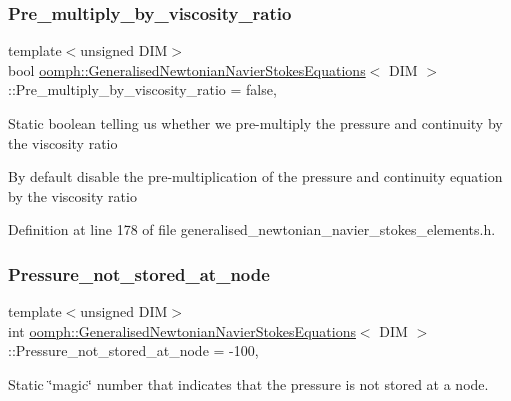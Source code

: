 \subsubsection{\texorpdfstring{Pre\+\_\+multiply\+\_\+by\+\_\+viscosity\+\_\+ratio}{Pre\_multiply\_by\_viscosity\_ratio}}
{\footnotesize\ttfamily template$<$unsigned D\+IM$>$ \\
bool \hyperlink{classoomph_1_1GeneralisedNewtonianNavierStokesEquations}{oomph\+::\+Generalised\+Newtonian\+Navier\+Stokes\+Equations}$<$ D\+IM $>$\+::Pre\+\_\+multiply\+\_\+by\+\_\+viscosity\+\_\+ratio = false\hspace{0.3cm}{\ttfamily [static]}, {\ttfamily [protected]}}

Static boolean telling us whether we pre-\/multiply the pressure and continuity by the viscosity ratio

By default disable the pre-\/multiplication of the pressure and continuity equation by the viscosity ratio 

Definition at line 178 of file generalised\+\_\+newtonian\+\_\+navier\+\_\+stokes\+\_\+elements.\+h.

\mbox{\label{classoomph_1_1GeneralisedNewtonianNavierStokesEquations_aa00dd91ac0f799d0f2798248db7e55d8}} 
\subsubsection{\texorpdfstring{Pressure\+\_\+not\+\_\+stored\+\_\+at\+\_\+node}{Pressure\_not\_stored\_at\_node}}
{\footnotesize\ttfamily template$<$unsigned D\+IM$>$ \\
int \hyperlink{classoomph_1_1GeneralisedNewtonianNavierStokesEquations}{oomph\+::\+Generalised\+Newtonian\+Navier\+Stokes\+Equations}$<$ D\+IM $>$\+::Pressure\+\_\+not\+\_\+stored\+\_\+at\+\_\+node = -\/100\hspace{0.3cm}{\ttfamily [static]}, {\ttfamily [private]}}



Static \char`\"{}magic\char`\"{} number that indicates that the pressure is not stored at a node. 


